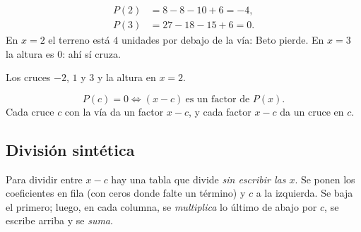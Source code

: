 \documentclass[11pt,a4paper]{article}
\begin{document}
\begin{minipage}[c]{0.47\linewidth}
\begin{ejemplo}
\begin{align*}
P(2)&=8-8-10+6=-4,\\
P(3)&=27-18-15+6=0 .
\end{align*}
En $x=2$ el terreno está $4$ unidades por debajo de la vía: Beto pierde. En $x=3$ la altura es $0$: ahí sí cruza.
\end{ejemplo}
\end{minipage}\hfill
\begin{minipage}[c]{0.5\linewidth}\centering
{}

{\small\color{zmute}Los cruces $-2$, $1$ y $3$ y la altura en $x=2$.}
\end{minipage}

\begin{propiedad}
\[ P(c)=0 \iff (x-c)\ \text{es un factor de } P(x). \]
Cada cruce $c$ con la vía da un factor $x-c$, y cada factor $x-c$ da un cruce en $c$.
\end{propiedad}

\subsection{División sintética}
Para dividir entre $x-c$ hay una tabla que divide \emph{sin escribir las $x$}. Se ponen los coeficientes en fila
(con ceros donde falte un término) y $c$ a la izquierda. Se baja el primero; luego, en cada columna, se
\emph{multiplica} lo último de abajo por $c$, se escribe arriba y se \emph{suma}.
\end{document}
